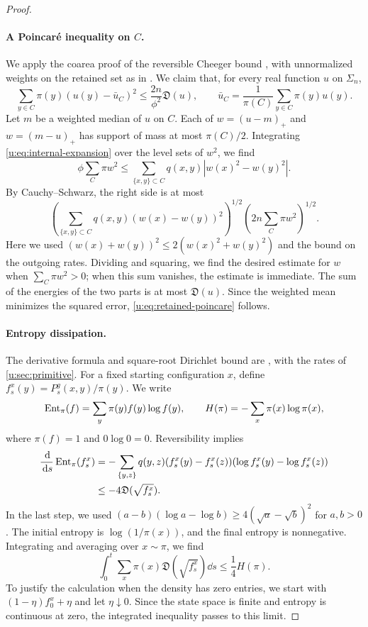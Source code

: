 \begin{proof}
\paragraph{A Poincar\'e inequality on $C$.}
We apply the coarea proof of the reversible Cheeger bound
\cite[Theorem~3.5]{lawler-sokal-1988}, with unnormalized weights on the
retained set as in \cite[Section~7, proof of Lemma~8]{oai-typical-upper}.
We claim that, for every real function $u$ on $\Sigma_n$,
\begin{equation}\label{u:eq:retained-poincare}
 \sum_{y\in C}\pi(y)(u(y)-\bar u_C)^2
 \le\frac{2n}{\phi^2}\mathfrak D(u),
 \qquad
 \bar u_C=\frac1{\pi(C)}\sum_{y\in C}\pi(y)u(y).
\end{equation}
Let $m$ be a weighted median of $u$ on $C$. Each of
$w=(u-m)_+$ and $w=(m-u)_+$ has support of mass at most $\pi(C)/2$.
Integrating \eqref{u:eq:internal-expansion} over the level sets of $w^2$,
we find
\[
 \phi\sum_C\pi w^2
 \le\sum_{\{x,y\}\subset C}q(x,y)|w(x)^2-w(y)^2|.
\]
By Cauchy--Schwarz, the right side is at most
\[
 \left(\sum_{\{x,y\}\subset C}q(x,y)(w(x)-w(y))^2\right)^{1/2}
 \left(2n\sum_C\pi w^2\right)^{1/2}.
\]
Here we used $(w(x)+w(y))^2\le2(w(x)^2+w(y)^2)$ and the bound on the
outgoing rates. Dividing and squaring, we find the desired estimate for $w$ when
$\sum_C\pi w^2>0$; when this sum vanishes, the estimate is
immediate. The sum of the energies of the two parts is at most
$\mathfrak D(u)$. Since the weighted mean minimizes the squared error,
\eqref{u:eq:retained-poincare} follows.

\paragraph{Entropy dissipation.}
The derivative formula and square-root Dirichlet bound are
\cite[Lemmas~2.5 and~2.7]{diaconis-saloff-coste-1996}, with the rates
of \cref{u:sec:primitive}.
For a fixed starting configuration $x$, define
$f_s^x(y)=P_s^g(x,y)/\pi(y)$. We write
\[
 \operatorname{Ent}_\pi(f)=\sum_y\pi(y)f(y)\log f(y),\qquad
 H(\pi)=-\sum_x\pi(x)\log\pi(x),
\]
where $\pi(f)=1$ and $0\log0=0$. Reversibility implies
\begin{align*}
 \frac{\,\mathrm d}{\,\mathrm d s}\operatorname{Ent}_\pi(f_s^x)
 &=-\sum_{\{y,z\}}q(y,z)
       (f_s^x(y)-f_s^x(z))(\log f_s^x(y)-\log f_s^x(z))\\
 &\le-4\mathfrak D(\sqrt{f_s^x}).
\end{align*}
In the last step, we used
$(a-b)(\log a-\log b)\ge4(\sqrt a-\sqrt b)^2$ for $a,b>0$.
The initial entropy is $\log(1/\pi(x))$, and the final entropy is
nonnegative. Integrating and averaging over $x\sim\pi$, we find
\begin{equation}\label{u:eq:continuous-dissipation}
 \int_0^t\sum_x\pi(x)\mathfrak D(\sqrt{f_s^x})\dd s
 \le\frac14H(\pi).
\end{equation}
To justify the calculation when the density has zero entries, we start
with $(1-\eta)f_0^x+\eta$ and let $\eta\downarrow0$. Since the state
space is finite and entropy is continuous at zero, the integrated
inequality passes to this limit.


\end{proof}
